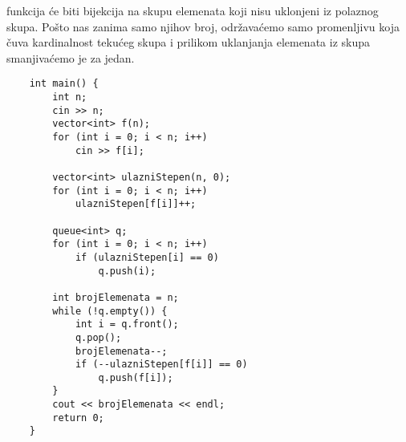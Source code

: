 \documentclass{article}
\begin{document}
funkcija će biti bijekcija na skupu elemenata koji nisu uklonjeni iz polaznog
skupa. Pošto nas zanima samo njihov broj, održavaćemo samo promenljivu
koja čuva kardinalnost tekućeg skupa i prilikom uklanjanja elemenata iz skupa
smanjivaćemo je za jedan.
\begin{lstlisting}
    int main() {
        int n;
        cin >> n;
        vector<int> f(n);
        for (int i = 0; i < n; i++)
            cin >> f[i];

        vector<int> ulazniStepen(n, 0);
        for (int i = 0; i < n; i++)
            ulazniStepen[f[i]]++;
        
        queue<int> q;
        for (int i = 0; i < n; i++)
            if (ulazniStepen[i] == 0)
                q.push(i);

        int brojElemenata = n;
        while (!q.empty()) {
            int i = q.front();
            q.pop();
            brojElemenata--;
            if (--ulazniStepen[f[i]] == 0)
                q.push(f[i]);
        }
        cout << brojElemenata << endl;
        return 0;
    }
\end{lstlisting}
\end{document}
